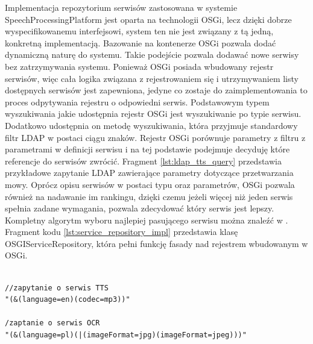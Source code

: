 Implementacja repozytorium serwisów zastosowana w systemie SpeechProcessingPlatform jest oparta na technologii OSGi, lecz dzięki dobrze wyspecifikowanemu interfejsowi, system ten nie jest związany z tą jedną, konkretną implementacją. Bazowanie na kontenerze OSGi pozwala dodać dynamiczną naturę do systemu. Takie podejście pozwala dodawać nowe serwisy bez zatrzymywania systemu. Ponieważ OSGi posiada wbudowany rejestr serwisów, więc cała logika związana z rejestrowaniem się i utrzymywaniem listy dostępnych serwisów jest zapewniona, jedyne co zostaje do zaimplementowania to proces odpytywania rejestru o odpowiedni serwis. Podstawowym typem wyszukiwania jakie udostępnia rejestr OSGi jest wyszukiwanie po typie serwisu. Dodatkowo udostępnia on metodę wyszukiwania, która przyjmuje standardowy filtr LDAP \cite{ldaprfc1996} w postaci ciągu znaków. Rejestr OSGi porównuje parametry z filtru z parametrami w definicji serwisu i na tej podstawie podejmuje decyduję które referencje do serwisów zwrócić. Fragment \ref{lst:ldap_tts_query} przedstawia przykładowe zapytanie LDAP zawierające parametry dotyczące przetwarzania mowy. Oprócz opisu serwisów w postaci typu oraz parametrów, OSGi pozwala również na nadawanie im rankingu, dzięki czemu jeżeli więcej niż jeden serwis spełnia zadane wymagania, pozwala zdecydować który serwis jest lepszy. Kompletny algorytm wyboru najlepiej pasującego serwisu można znaleźć w \cite{hall2011}. Fragment kodu \ref{lst:service_repository_impl} przedstawia klasę OSGIServiceRepository, która pełni funkcję fasady nad rejestrem wbudowanym w OSGi.

\lstset{language=Java, tabsize=4, caption=Przykładowe zapytanie LDAP zawierające parametry dotyczące serwisu TTS ,label=lst:ldap_tts_query}

\begin{center}
\begin{lstlisting}

//zapytanie o serwis TTS
"(&(language=en)(codec=mp3))"

/zaptanie o serwis OCR
"(&(language=pl)(|(imageFormat=jpg)(imageFormat=jpeg)))"


\end{lstlisting}
\end{center}

\lstset{language=Java, tabsize=4, caption=Częściowa definicja klasy OSGIServiceRepository będącą fasadą nad Rejestrem OSGi. ,label=lst:service_repository_impl}


